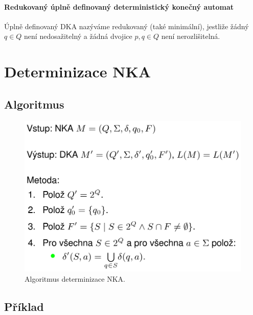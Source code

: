 \paragraph*{Redukovaný úplně definovaný deterministický konečný automat} Úplně definovaný DKA nazýváme redukovaný (také minimální), jestliže žádný $q \in Q$ není nedosažitelný a žádná dvojice $p, q \in Q$ není nerozlišitelná.


\section{Determinizace NKA}

\subsection*{Algoritmus}

\begin{figure}[H]
    \centering
    \includegraphics[width=0.7\linewidth]{nka_to_dka.pdf}
    \caption{Algoritmus determinizace NKA.}
\end{figure}

\subsection*{Příklad}

